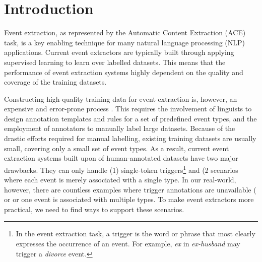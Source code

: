 \section{Introduction}
%

Event extraction, as represented by the Automatic Content Extraction (ACE) task, is a key enabling technique for many natural language
processing (NLP) applications.  Current event extractors are typically built through applying supervised learning to learn over labelled
datasets. This means that the performance of event extraction systems highly dependent on the quality and coverage of the training
datasets.

Constructing high-quality training data for event extraction is, however, an expensive and error-prone process
\cite{aguilar2014comparison,song2015light}. This requires the involvement of linguists to design annotation templates and rules for a set
of predefined event types, and the employment of annotators to manually label  large datasets. Because of the drastic efforts required for
manual labelling, existing training datasets are usually small, covering only a small set of event types. As a result, current event
extraction systems built upon of human-annotated datasets have two major drawbacks. They can only handle (1) single-token
triggers\footnote{In the event extraction task, a trigger is the word or phrase that most clearly expresses the occurrence of an event. For
example, \textit{ex} in \textit{ex-husband} may trigger a \emph{divorce} event.} and (2 scenarios where  each event is merely associated
with a single type. In our real-world, however, there are countless examples where trigger annotations are unavailable ( or or one event is associated with multiple types. To make event extractors more practical, we
need to find ways to support these scenarios.

